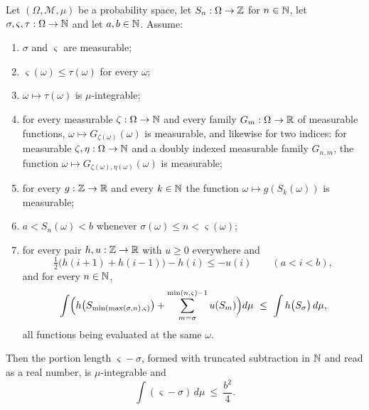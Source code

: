 \begin{lemma}
Let $(\Omega,\mathcal M,\mu)$ be a probability space, let $S_n:\Omega\to\mathbb{Z}$ for
$n\in\mathbb{N}$, let $\sigma,\varsigma,\tau:\Omega\to\mathbb{N}$ and let $a,b\in\mathbb{N}$. Assume:
\begin{enumerate}
\item\label{it:epl-meas} $\sigma$ and $\varsigma$ are measurable;
\item\label{it:epl-dom} $\varsigma(\omega)\le\tau(\omega)$ for every $\omega$;
\item\label{it:epl-tauint} $\omega\mapsto\tau(\omega)$ is $\mu$-integrable;
\item\label{it:epl-rand} for every measurable $\zeta:\Omega\to\mathbb{N}$ and every
family $G_m:\Omega\to\mathbb{R}$ of measurable functions, $\omega\mapsto
G_{\zeta(\omega)}(\omega)$ is measurable, and likewise for two indices: for
measurable $\zeta,\eta:\Omega\to\mathbb{N}$ and a doubly indexed measurable family
$G_{n,m}$, the function $\omega\mapsto G_{\zeta(\omega),\eta(\omega)}(\omega)$
is measurable;
\item\label{it:epl-gS} for every $g:\mathbb{Z}\to\mathbb{R}$ and every $k\in\mathbb{N}$ the function
$\omega\mapsto g(S_k(\omega))$ is measurable;
\item\label{it:epl-win} $a<S_n(\omega)<b$ whenever
$\sigma(\omega)\le n<\varsigma(\omega)$;
\item\label{it:epl-cmp} for every pair $h,u:\mathbb{Z}\to\mathbb{R}$ with $u\ge0$ everywhere
and
\[
  \tfrac12\bigl(h(i+1)+h(i-1)\bigr)-h(i)\le-u(i)\qquad(a<i<b),
\]
and for every $n\in\mathbb{N}$,
\[
  \int\Bigl(h\bigl(S_{\min(\max(\sigma,n),\varsigma)}\bigr)
     +\sum_{m=\sigma}^{\min(n,\varsigma)-1}u(S_m)\Bigr)d\mu
   \ \le\ \int h\bigl(S_{\sigma}\bigr)\,d\mu ,
\]
all functions being evaluated at the same $\omega$.
\end{enumerate}
Then the portion length $\varsigma-\sigma$, formed with truncated subtraction
in $\mathbb{N}$ and read as a real number, is $\mu$-integrable and
\[
  \int(\varsigma-\sigma)\,d\mu\ \le\ \frac{b^2}{4} .
\]
\end{lemma}
